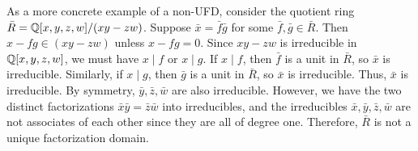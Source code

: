\begin{example}
    As a more concrete example of a non-UFD, consider the quotient ring $\bar{R} = \mathbb{Q}[x,y,z,w]/(xy-zw)$. Suppose $\bar{x} = \bar{f} \bar{g}$ for some $\bar{f}, \bar{g} \in \bar{R}$. Then $x - fg \in (xy-zw)$ unless $x - fg = 0$. Since $xy-zw$ is irreducible in $\mathbb{Q}[x,y,z,w]$, we must have $x \mid f$ or $x \mid g$. If $x \mid f$, then $\bar{f}$ is a unit in $\bar{R}$, so $\bar{x}$ is irreducible. Similarly, if $x \mid g$, then $\bar{g}$ is a unit in $\bar{R}$, so $\bar{x}$ is irreducible. Thus, $\bar{x}$ is irreducible. By symmetry, $\bar{y}, \bar{z}, \bar{w}$ are also irreducible. However, we have the two distinct factorizations $\bar{x}\bar{y} = \bar{z}\bar{w}$ into irreducibles, and the irreducibles $\bar{x}, \bar{y}, \bar{z}, \bar{w}$ are not associates of each other since they are all of degree one. Therefore, $\bar{R}$ is not a unique factorization domain.
\end{example}

